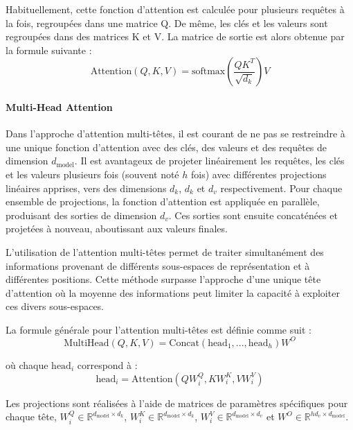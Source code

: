 Habituellement, cette fonction d'attention est calculée pour plusieurs requêtes à la fois, regroupées dans une matrice Q. De même, les clés et les valeurs sont regroupées dans des matrices K et V. La matrice de sortie est alors obtenue par la formule suivante :
\begin{equation}
    \text{Attention}(Q, K, V) = \text{softmax}\left(\frac{QK^T}{\sqrt{d_k}}\right)V
\end{equation}

\paragraph{Multi-Head Attention} \hspace{0pt}

Dans l'approche d'attention multi-têtes, il est courant de ne pas se restreindre à une unique fonction d'attention avec des clés, des valeurs et des requêtes de dimension \(d_{\text{model}}\). Il est avantageux de projeter linéairement les requêtes, les clés et les valeurs plusieurs fois (souvent noté \(h\) fois) avec différentes projections linéaires apprises, vers des dimensions \(d_k\), \(d_k\) et \(d_v\) respectivement. Pour chaque ensemble de projections, la fonction d'attention est appliquée en parallèle, produisant des sorties de dimension \(d_v\). Ces sorties sont ensuite concaténées et projetées à nouveau, aboutissant aux valeurs finales.

L'utilisation de l'attention multi-têtes permet de traiter simultanément des informations provenant de différents sous-espaces de représentation et à différentes positions. Cette méthode surpasse l'approche d'une unique tête d'attention où la moyenne des informations peut limiter la capacité à exploiter ces divers sous-espaces.

La formule générale pour l'attention multi-têtes est définie comme suit :
\begin{equation}
    \text{MultiHead}(Q, K, V) = \text{Concat}(\text{head}_1, ..., \text{head}_h)W^O
\end{equation}

où chaque \(\text{head}_i\) correspond à : 
\begin{equation}
    \text{head}_i = \text{Attention}(QW^Q_i, KW^K_i, VW^V_i)
\end{equation}

Les projections sont réalisées à l'aide de matrices de paramètres spécifiques pour chaque tête, \(W^Q_i \in \mathbb{R}^{d_{\text{model}} \times d_k}\), \(W^K_i \in \mathbb{R}^{d_{\text{model}} \times d_k}\), \(W^V_i \in \mathbb{R}^{d_{\text{model}} \times d_v}\) et \(W^O \in \mathbb{R}^{hd_v \times d_{\text{model}}}\).

